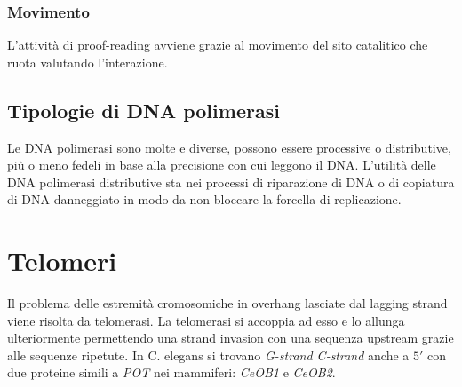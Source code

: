 		\subsubsection{Movimento}
		L'attivit\`a di proof-reading avviene grazie al movimento del sito catalitico che ruota valutando l'interazione.

	\subsection{Tipologie di DNA polimerasi}
	Le DNA polimerasi sono molte e diverse, possono essere processive o distributive, pi\`u o meno fedeli in base alla precisione con cui leggono  il DNA.
	L'utilit\`a delle DNA polimerasi distributive sta nei processi di riparazione di DNA o di copiatura di DNA danneggiato in modo da non bloccare la forcella di replicazione.

\section{Telomeri}
Il problema delle estremit\`a cromosomiche in overhang lasciate dal lagging strand viene risolta da telomerasi.
La telomerasi si accoppia ad esso e lo allunga ulteriormente permettendo una strand invasion con una sequenza upstream grazie alle sequenze ripetute.
In C. elegans si trovano \emph{G-strand C-strand} anche a $5'$ con due proteine simili a \emph{POT} nei mammiferi: \emph{CeOB1} e \emph{CeOB2}.
